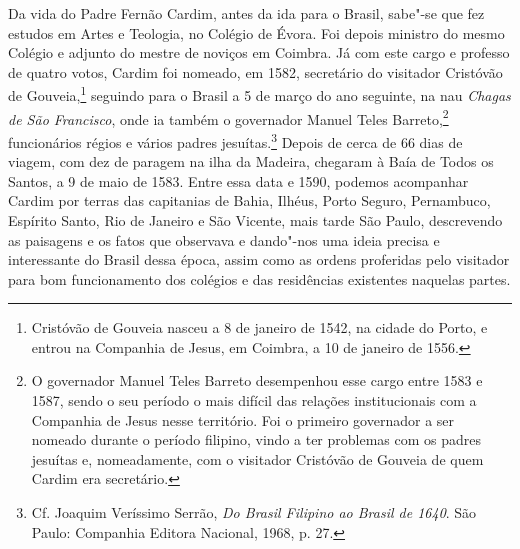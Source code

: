  Da vida do Padre Fernão Cardim, antes da ida para o Brasil, sabe"-se
que fez estudos em Artes e Teologia, no Colégio de Évora. Foi depois
ministro do mesmo Colégio e adjunto do mestre de noviços em Coimbra. Já
com este cargo e professo de quatro votos, Cardim foi nomeado, em 1582,
secretário do visitador Cristóvão de Gouveia,\footnote{ Cristóvão
de Gouveia nasceu a 8 de janeiro de 1542, na cidade do Porto, e entrou
na Companhia de Jesus, em Coimbra, a 10 de janeiro de 1556.} 
seguindo para o Brasil a 5 de março do ano seguinte, na nau
\textit{Chagas de São Francisco}, onde ia também o governador Manuel
Teles Barreto,\footnote{ O governador Manuel Teles Barreto
desempenhou esse cargo entre 1583 e 1587, sendo o seu período o mais
difícil das relações institucionais com a Companhia de Jesus nesse
território. Foi o primeiro governador a ser nomeado durante o período
filipino, vindo a ter problemas com os padres jesuítas e, nomeadamente,
com o visitador Cristóvão de Gouveia de quem Cardim era secretário.} 
funcionários régios e vários padres jesuítas.\footnote{ Cf.
Joaquim Veríssimo Serrão, \textit{Do Brasil Filipino ao Brasil de 1640}. 
São Paulo: Companhia Editora Nacional, 1968, p. 27.} Depois de cerca
de 66 dias de viagem, com dez de paragem na ilha da
Madeira, chegaram à Baía de Todos os Santos, a 9 de maio de 1583. Entre
essa data e 1590, podemos acompanhar Cardim por terras das capitanias
de Bahia, Ilhéus, Porto Seguro, Pernambuco, Espírito Santo, Rio de
Janeiro e São Vicente, mais tarde São Paulo, descrevendo as paisagens e
os fatos que observava e dando"-nos uma ideia precisa e interessante do
Brasil dessa época, assim como as ordens proferidas pelo visitador para
bom funcionamento dos colégios e das residências existentes naquelas partes.

